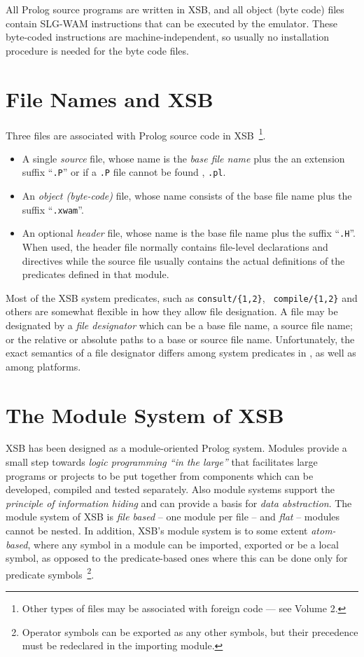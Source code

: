 \noindent
All Prolog source programs are written in XSB, and all object (byte
code) files contain SLG-WAM instructions that can be executed by the
emulator.  These byte-coded instructions are machine-independent, so
usually no installation procedure is needed for the byte code files.

\section{File Names and XSB}  \label{sec:filenames}
%
Three files are associated with Prolog source code in
XSB~\footnote{Other types of files may be associated with foreign code
--- see Volume 2.}.
\begin{itemize}
\item A single {\it source} file, whose name is the {\em base file name} plus 
      the an extension suffix ``{\tt .P}'' or if a {\tt .P} file
      cannot be found , {\tt .pl}.   
\item An {\it object (byte-code)} file, whose name consists of the
base file name plus the suffix ``{\tt .xwam}''.
\item An optional {\it header} file, whose name is the base file name plus 
      the suffix ``{\tt .H}''.  When used, the header file normally
      contains file-level declarations and directives while the source
      file usually contains the actual definitions of the predicates
      defined in that module.
\end{itemize}
%
Most of the XSB system predicates, such as {\tt consult/\{1,2\}}, {\tt
compile/\{1,2\}} and others are somewhat flexible in how they allow
file designation.  A file may be designated by a {\em file designator}
which can be a base file name, a source file name; or the relative or
absolute paths to a base or source file name.  Unfortunately, the
exact semantics of a file designator differs among system predicates
in \version, as well as among platforms.

\section{The Module System of XSB} \label{Modules}
XSB has been designed as a module-oriented Prolog system.  Modules
provide a small step towards {\em logic programming ``in the large''}
that facilitates large programs or projects to be put together from
components which can be developed, compiled and tested separately.
Also module systems support the {\em principle of information hiding}
and can provide a basis for {\em data abstraction}.  The module system
of XSB is {\em file based} -- one module per file -- and {\em flat} --
modules cannot be nested.  In addition, XSB's module system is to some
extent {\em atom-based}, where any symbol in a module can be imported,
exported or be a local symbol, as opposed to the predicate-based ones
where this can be done only for predicate symbols~\footnote{Operator
  symbols can be exported as any other symbols, but their precedence
  must be redeclared in the importing module.}.

